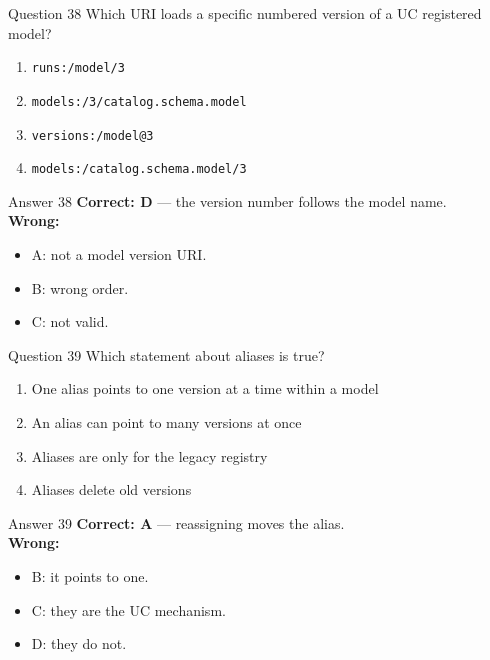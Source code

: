 \documentclass[aspectratio=169,11pt]{beamer}
\begin{document}
\begin{frame}{Question 38}
Which URI loads a specific numbered version of a UC registered model?
\begin{enumerate}[label=\Alph*.]
\item \texttt{runs:/model/3}
\item \texttt{models:/3/catalog.schema.model}
\item \texttt{versions:/model@3}
\item \texttt{models:/catalog.schema.model/3}
\end{enumerate}
\end{frame}
\begin{frame}{Answer 38}
\textbf{Correct: D} --- the version number follows the model name.\\
\vspace{0.5em}
\textbf{Wrong:}
\begin{itemize}
\item A: not a model version URI.
\item B: wrong order.
\item C: not valid.
\end{itemize}
\end{frame}

\begin{frame}{Question 39}
Which statement about aliases is true?
\begin{enumerate}[label=\Alph*.]
\item One alias points to one version at a time within a model
\item An alias can point to many versions at once
\item Aliases are only for the legacy registry
\item Aliases delete old versions
\end{enumerate}
\end{frame}
\begin{frame}{Answer 39}
\textbf{Correct: A} --- reassigning moves the alias.\\
\vspace{0.5em}
\textbf{Wrong:}
\begin{itemize}
\item B: it points to one.
\item C: they are the UC mechanism.
\item D: they do not.
\end{itemize}
\end{frame}
\end{document}
